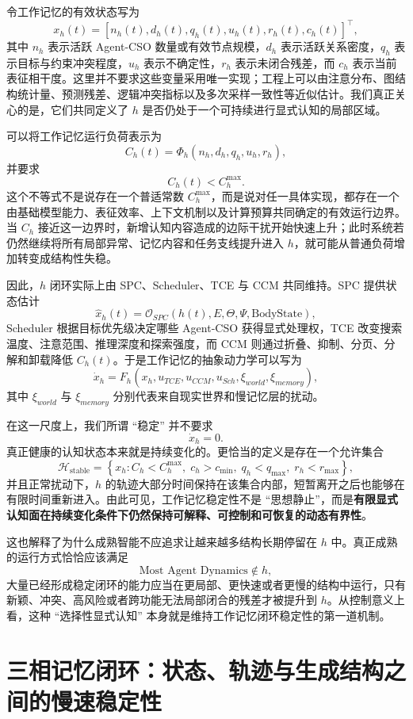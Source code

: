 令工作记忆的有效状态写为
\[
x_h(t)
=
\left[
n_h(t),
d_h(t),
q_h(t),
u_h(t),
r_h(t),
c_h(t)
\right]^{\top},
\]
其中 $n_h$ 表示活跃 Agent-CSO 数量或有效节点规模，$d_h$ 表示活跃关系密度，$q_h$ 表示目标与约束冲突程度，$u_h$ 表示不确定性，$r_h$ 表示未闭合残差，而 $c_h$ 表示当前表征相干度。这里并不要求这些变量采用唯一实现；工程上可以由注意分布、图结构统计量、预测残差、逻辑冲突指标以及多次采样一致性等近似估计。我们真正关心的是，它们共同定义了 $h$ 是否仍处于一个可持续进行显式认知的局部区域。

可以将工作记忆运行负荷表示为
\[
C_h(t)
=
\Phi_h
\left(
n_h,d_h,q_h,u_h,r_h
\right),
\]
并要求
\[
C_h(t)
<
C_h^{\max}.
\]
这个不等式不是说存在一个普适常数 $C_h^{\max}$，而是说对任一具体实现，都存在一个由基础模型能力、表征效率、上下文机制以及计算预算共同确定的有效运行边界。当 $C_h$ 接近这一边界时，新增认知内容造成的边际干扰开始快速上升；此时系统若仍然继续将所有局部异常、记忆内容和任务支线提升进入 $h$，就可能从普通负荷增加转变成结构性失稳。

因此，$h$ 闭环实际上由 SPC、Scheduler、TCE 与 CCM 共同维持。SPC 提供状态估计
\[
\hat{x}_h(t)
=
\mathcal O_{SPC}
\left(
h(t),E,\Theta,\Psi,\text{BodyState}
\right),
\]
Scheduler 根据目标优先级决定哪些 Agent-CSO 获得显式处理权，TCE 改变搜索温度、注意范围、推理深度和探索强度，而 CCM 则通过折叠、抑制、分页、分解和卸载降低 $C_h(t)$。于是工作记忆的抽象动力学可以写为
\[
\dot{x}_h
=
F_h
\left(
x_h,
u_{TCE},
u_{CCM},
u_{Sch},
\xi_{world},
\xi_{memory}
\right),
\]
其中 $\xi_{world}$ 与 $\xi_{memory}$ 分别代表来自现实世界和慢记忆层的扰动。

在这一尺度上，我们所谓 ``稳定'' 并不要求
\[
\dot{x}_h=0.
\]
真正健康的认知状态本来就是持续变化的。更恰当的定义是存在一个允许集合
\[
\mathcal H_{\mathrm{stable}}
=
\left\{
x_h:
C_h<C_h^{\max},
\;
c_h>c_{\min},
\;
q_h<q_{\max},
\;
r_h<r_{\max}
\right\},
\]
并且正常扰动下，$h$ 的轨迹大部分时间保持在该集合内部，短暂离开之后也能够在有限时间重新进入。由此可见，工作记忆稳定性不是 ``思想静止''，而是\textbf{有限显式认知面在持续变化条件下仍然保持可解释、可控制和可恢复的动态有界性}。

这也解释了为什么成熟智能不应追求让越来越多结构长期停留在 $h$ 中。真正成熟的运行方式恰恰应该满足
\[
\boxed{
\text{Most Agent Dynamics}\notin h,
}
\]
大量已经形成稳定闭环的能力应当在更局部、更快速或者更慢的结构中运行，只有新颖、冲突、高风险或者跨功能无法局部闭合的残差才被提升到 $h$。从控制意义上看，这种 ``选择性显式认知'' 本身就是维持工作记忆闭环稳定性的第一道机制。

\section{三相记忆闭环：状态、轨迹与生成结构之间的慢速稳定性}

